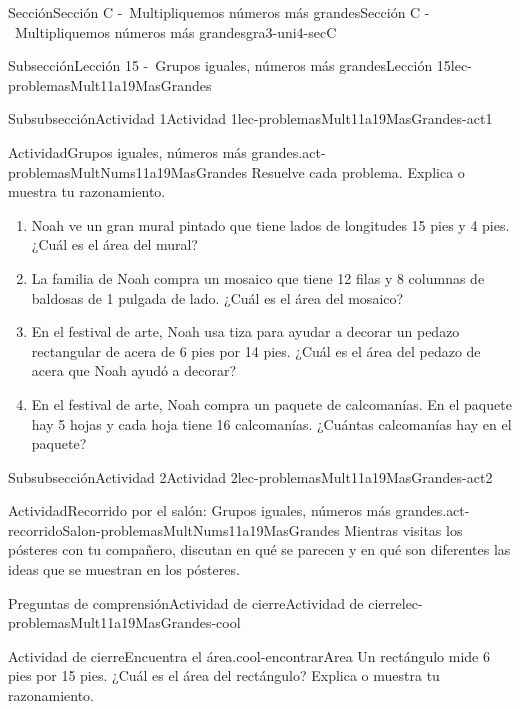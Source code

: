 \documentclass[twoside,10pt,]{article}
\begin{document}
\begin{sectionptx}{Sección}{Sección C -~Multipliquemos números más grandes}{}{Sección C -~Multipliquemos números más grandes}{}{}{gra3-uni4-secC}
\begin{subsectionptx}{Subsección}{Lección 15 -~Grupos iguales, números más grandes}{}{Lección 15}{}{}{lec-problemasMult11a19MasGrandes}
\begin{subsubsectionptx}{Subsubsección}{Actividad 1}{}{Actividad 1}{}{}{lec-problemasMult11a19MasGrandes-act1}
\begin{activity}{Actividad}{Grupos iguales, números más grandes.}{act-problemasMultNums11a19MasGrandes}
Resuelve cada problema. Explica o muestra tu razonamiento.%
%
\begin{enumerate}
\item{}Noah ve un gran mural pintado que tiene lados de longitudes 15 pies y 4 pies. ¿Cuál es el área del mural?%
\item{}La familia de Noah compra un mosaico que tiene 12 filas y 8 columnas de baldosas de 1 pulgada de lado. ¿Cuál es el área del mosaico?%
\item{}En el festival de arte, Noah usa tiza para ayudar a decorar un pedazo rectangular de acera de 6 pies por 14 pies. ¿Cuál es el área del pedazo de acera que Noah ayudó a decorar?%
\item{}En el festival de arte, Noah compra un paquete de calcomanías. En el paquete hay 5 hojas y cada hoja tiene 16 calcomanías. ¿Cuántas calcomanías hay en el paquete?%
\end{enumerate}
\end{activity}%
\end{subsubsectionptx}
%
%
\typeout{************************************************}
\typeout{************************************************}
%
\begin{subsubsectionptx}{Subsubsección}{Actividad 2}{}{Actividad 2}{}{}{lec-problemasMult11a19MasGrandes-act2}
\begin{activity}{Actividad}{Recorrido por el salón: Grupos iguales, números más grandes.}{act-recorridoSalon-problemasMultNums11a19MasGrandes}%
Mientras visitas los pósteres con tu compañero, discutan en qué se parecen y en qué son diferentes las ideas que se muestran en los pósteres.%
\end{activity}%
\end{subsubsectionptx}
%
%
\typeout{************************************************}
\typeout{************************************************}
%
\begin{reading-questions-subsubsection}{Preguntas de comprensión}{Actividad de cierre}{}{Actividad de cierre}{}{}{lec-problemasMult11a19MasGrandes-cool}
\begin{project}{Actividad de cierre}{Encuentra el área.}{cool-encontrarArea}%
Un rectángulo mide 6 pies por 15 pies. ¿Cuál es el área del rectángulo? Explica o muestra tu razonamiento.%
\end{project}%
\end{reading-questions-subsubsection}
\end{subsectionptx}

\end{sectionptx}
\end{document}
